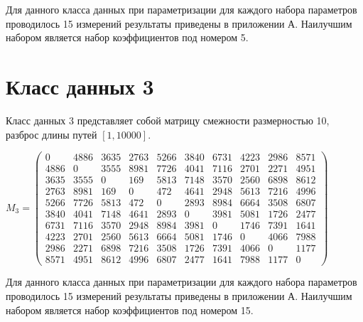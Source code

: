 Для данного класса данных при параметризации для каждого набора параметров проводилось 15 измерений результаты приведены в приложении А. Наилучшим набором является набор коэффициентов под номером 5.


\section{Класс данных 3}

Класс данных 3 представляет собой матрицу смежности размерностью 10, разброс длины путей $[1, 10000]$.

$M_{3} = 
\begin{pmatrix}0 & 4886 & 3635 & 2763 & 5266 & 3840 & 6731 & 4223 & 2986 & 8571 \\
			4886 & 0 & 3555 & 8981 & 7726 & 4041 & 7116 & 2701 & 2271 & 4951 \\
			3635 & 3555 & 0 & 169 & 5813 & 7148 & 3570 & 2560 & 6898 & 8612 \\
			2763 & 8981 & 169 & 0 & 472 & 4641 & 2948 & 5613 & 7216 & 4996 \\
			5266 & 7726 & 5813 & 472 & 0 & 2893 & 8984 & 6664 & 3508 & 6807 \\
			3840 & 4041 & 7148 & 4641 & 2893 & 0 & 3981 & 5081 & 1726 & 2477 \\
			6731 & 7116 & 3570 & 2948 & 8984 & 3981 & 0 & 1746 & 7391 & 1641 \\
			4223 & 2701 & 2560 & 5613 & 6664 & 5081 & 1746 & 0 & 4066 & 7988 \\
			2986 & 2271 & 6898 & 7216 & 3508 & 1726 & 7391 & 4066 & 0 & 1177 \\
			8571 & 4951 & 8612 & 4996 & 6807 & 2477 & 1641 & 7988 & 1177 & 0 \end{pmatrix}$
			
Для данного класса данных при параметризации для каждого набора параметров проводилось 15 измерений результаты приведены в приложении А. Наилучшим набором является набор коэффициентов под номером 15.

\clearpage
